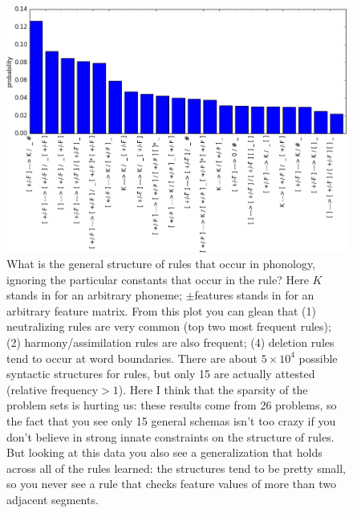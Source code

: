 \documentclass{article}
\begin{document}
\begin{figure}[h]
  \includegraphics[width = \textwidth]{skeletonFrequencies.png}
  \caption{What is the general structure of rules that occur in phonology, ignoring the particular constants that occur in the rule? Here $K$ stands in for an arbitrary phoneme; $\pm$features stands in for an arbitrary feature matrix. From this plot you can glean that (1) neutralizing rules are very common (top two most frequent rules); (2) harmony/assimilation rules are also frequent; (4) deletion rules tend to occur at word boundaries. There are about $5\times 10^4$ possible syntactic structures for rules, but only 15 are actually attested (relative frequency$ > 1$). Here I think that the sparsity of the problem sets is hurting us: these results come from 26 problems, so the fact that you see only 15 general schemas isn't too crazy if you don't believe in strong innate constraints on the structure of rules. But looking at this data you also see a generalization that holds across all of the rules learned: the structures tend to be pretty small, so you never see a rule that checks feature values of more than two adjacent segments.}
\end{figure}




\end{document}
